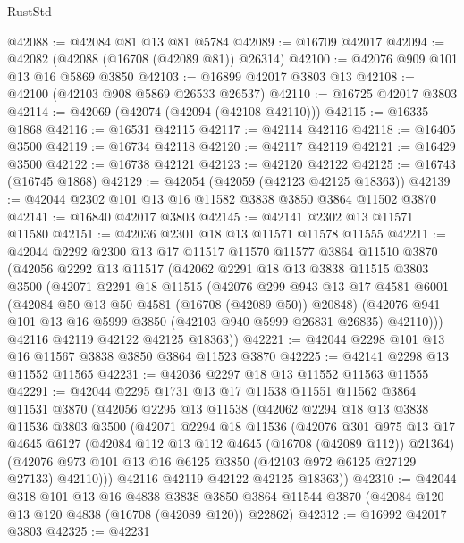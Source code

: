 \begin{lexlean}{RustStd}
\begin{coremodule}
@42088 := @42084 @81 @13 @81 @5784
@42089 := @16709 @42017
@42094 := @42082 (@42088 (@16708 (@42089 @81)) @26314)
@42100 := @42076 @909 @101 @13 @16 @5869 @3850
@42103 := @16899 @42017 @3803 @13
@42108 := @42100 (@42103 @908 @5869 @26533 @26537)
@42110 := @16725 @42017 @3803
@42114 := @42069 (@42074 (@42094 (@42108 @42110)))
@42115 := @16335 @1868
@42116 := @16531 @42115
@42117 := @42114 @42116
@42118 := @16405 @3500
@42119 := @16734 @42118
@42120 := @42117 @42119
@42121 := @16429 @3500
@42122 := @16738 @42121
@42123 := @42120 @42122
@42125 := @16743 (@16745 @1868)
@42129 := @42054 (@42059 (@42123 @42125 @18363))
@42139 := @42044 @2302 @101 @13 @16 @11582 @3838 @3850 @3864 @11502 @3870
@42141 := @16840 @42017 @3803
@42145 := @42141 @2302 @13 @11571 @11580
@42151 := @42036 @2301 @18 @13 @11571 @11578 @11555
@42211 := @42044
    @2292
    @2300
    @13
    @17
    @11517
    @11570
    @11577
    @3864
    @11510
    @3870
    (@42056
      @2292
      @13
      @11517
      (@42062
        @2291
        @18
        @13
        @3838
        @11515
        @3803
        @3500
        (@42071
          @2291
          @18
          @11515
          (@42076
            @299
            @943
            @13
            @17
            @4581
            @6001
            (@42084 @50 @13 @50 @4581 (@16708 (@42089 @50)) @20848)
            (@42076 @941 @101 @13 @16 @5999 @3850 (@42103 @940 @5999 @26831 @26835) @42110)))
        @42116
        @42119
        @42122
        @42125
        @18363))
@42221 := @42044 @2298 @101 @13 @16 @11567 @3838 @3850 @3864 @11523 @3870
@42225 := @42141 @2298 @13 @11552 @11565
@42231 := @42036 @2297 @18 @13 @11552 @11563 @11555
@42291 := @42044
    @2295
    @1731
    @13
    @17
    @11538
    @11551
    @11562
    @3864
    @11531
    @3870
    (@42056
      @2295
      @13
      @11538
      (@42062
        @2294
        @18
        @13
        @3838
        @11536
        @3803
        @3500
        (@42071
          @2294
          @18
          @11536
          (@42076
            @301
            @975
            @13
            @17
            @4645
            @6127
            (@42084 @112 @13 @112 @4645 (@16708 (@42089 @112)) @21364)
            (@42076 @973 @101 @13 @16 @6125 @3850 (@42103 @972 @6125 @27129 @27133) @42110)))
        @42116
        @42119
        @42122
        @42125
        @18363))
@42310 := @42044
    @318
    @101
    @13
    @16
    @4838
    @3838
    @3850
    @3864
    @11544
    @3870
    (@42084 @120 @13 @120 @4838 (@16708 (@42089 @120)) @22862)
@42312 := @16992 @42017 @3803
@42325 := @42231

\end{coremodule}
\end{lexlean}
